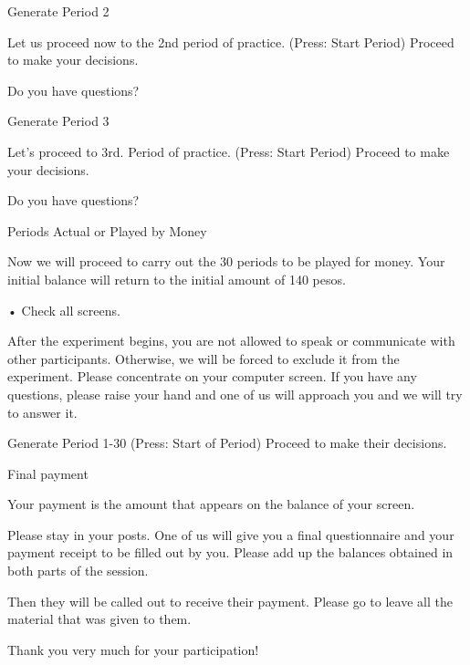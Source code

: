 Generate Period 2

Let us proceed now to the 2nd period of practice. (Press: Start Period) Proceed to make your decisions.

Do you have questions?

Generate Period 3

Let's proceed to 3rd. Period of practice. (Press: Start Period) Proceed to make your decisions.

Do you have questions?

Periods Actual or Played by Money

Now we will proceed to carry out the 30 periods to be played for money. Your initial balance will return to the initial amount of 140 pesos.

• Check all screens.

After the experiment begins, you are not allowed to speak or communicate with other participants. Otherwise, we will be forced to exclude it from the experiment. Please concentrate on your computer screen. If you have any questions, please raise your hand and one of us will approach you and we will try to answer it.

Generate Period 1-30 (Press: Start of Period)
Proceed to make their decisions.

Final payment

Your payment is the amount that appears on the balance of your screen.

Please stay in your posts. One of us will give you a final questionnaire and your payment receipt to be filled out by you. Please add up the balances obtained in both parts of the session.

Then they will be called out to receive their payment. Please go to leave all the material that was given to them.

Thank you very much for your participation!


